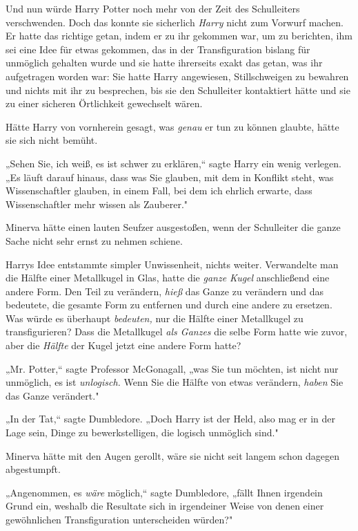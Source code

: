 {Und nun würde Harry Potter noch mehr von der Zeit des Schulleiters verschwenden. Doch das konnte sie sicherlich \emph{Harry} nicht zum Vorwurf machen. Er hatte das richtige getan, indem er zu ihr gekommen war, um zu berichten, ihm sei eine Idee für etwas gekommen, das in der Transfiguration bislang für unmöglich gehalten wurde und sie hatte ihrerseits exakt das getan, was ihr aufgetragen worden war: Sie hatte Harry angewiesen, Stillschweigen zu bewahren und nichts mit ihr zu besprechen, bis sie den Schulleiter kontaktiert hätte und sie zu einer sicheren Örtlichkeit gewechselt wären.

Hätte Harry von vornherein gesagt, was \emph{genau} er tun zu können glaubte, hätte sie sich nicht bemüht.

„Sehen Sie, ich weiß, es ist schwer zu erklären,“ sagte Harry ein wenig verlegen. „Es läuft darauf hinaus, dass was Sie glauben, mit dem in Konflikt steht, was Wissenschaftler glauben, in einem Fall, bei dem ich ehrlich erwarte, dass Wissenschaftler mehr wissen als Zauberer."

Minerva hätte einen lauten Seufzer ausgestoßen, wenn der Schulleiter die ganze Sache nicht sehr ernst zu nehmen schiene.

Harrys Idee entstammte simpler Unwissenheit, nichts weiter. Verwandelte man die Hälfte einer Metallkugel in Glas, hatte die \emph{ganze Kugel} anschließend eine andere Form. Den Teil zu verändern, \emph{hieß} das Ganze zu verändern und das bedeutete, die gesamte Form zu entfernen und durch eine andere zu ersetzen. Was würde es überhaupt \emph{bedeuten,} nur die Hälfte einer Metallkugel zu transfigurieren? Dass die Metallkugel \emph{als Ganzes} die selbe Form hatte wie zuvor, aber die \emph{Hälfte} der Kugel jetzt eine andere Form hatte?

„Mr. Potter,“ sagte Professor McGonagall, „was Sie tun möchten, ist nicht nur unmöglich, es ist \emph{unlogisch.} Wenn Sie die Hälfte von etwas verändern, \emph{haben} Sie das Ganze verändert."

„In der Tat,“ sagte Dumbledore. „Doch Harry ist der Held, also mag er in der Lage sein, Dinge zu bewerkstelligen, die logisch unmöglich sind."

Minerva hätte mit den Augen gerollt, wäre sie nicht seit langem schon dagegen abgestumpft.

„Angenommen, es \emph{wäre} möglich,“ sagte Dumbledore, „fällt Ihnen irgendein Grund ein, weshalb die Resultate sich in irgendeiner Weise von denen einer gewöhnlichen Transfiguration unterscheiden würden?"

}

